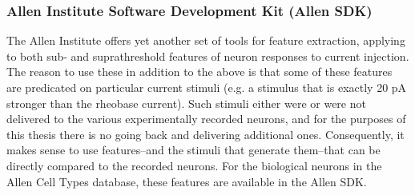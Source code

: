 \subsubsection{Allen Institute Software Development Kit (Allen SDK)}
The Allen Institute offers yet another set of tools for feature extraction, applying to both sub- and suprathreshold features of neuron responses to current injection.
The reason to use these in addition to the above is that some of these features are predicated on particular current stimuli (e.g. a stimulus that is exactly 20 pA stronger than the rheobase current).
Such stimuli either were or were not delivered to the various experimentally recorded neurons, and for the purposes of this thesis there is no going back and delivering additional ones.
Consequently, it makes sense to use features--and the stimuli that generate them--that can be directly compared to the recorded neurons.
For the biological neurons in the Allen Cell Types database, these features are available in the Allen SDK.
